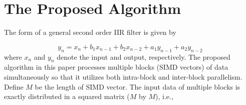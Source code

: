 \section{The Proposed Algorithm}
\label{sec:algorithm}

The form of a general second order IIR filter is given by

\begin{equation}
    \label{eq:recursive_filter}
    y_n = x_n + b_1x_{n-1} + b_2x_{n-2} + a_1y_{n-1} + a_2y_{n-2}
\end{equation}
where $x_n$ and $y_n$ denote the input and output, respectively.
The proposed algorithm in this paper processes multiple blocks (SIMD vectors) of data simultaneously
so that it utilizes both intra-block and inter-block parallelism. Define $M$ be the length of SIMD vector.
The input data of multiple blocks is exactly distributed in a squared matrix ($M$ by $M$), i.e.,



